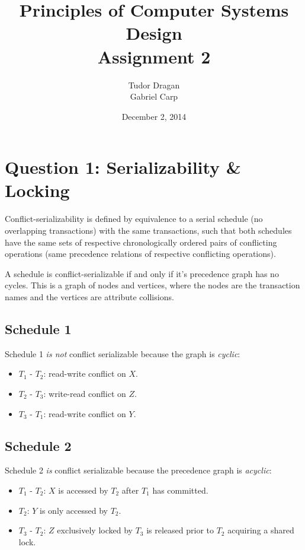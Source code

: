 \documentclass{article}      %
\title{\bf Principles of Computer Systems Design\\ {\Large Assignment 2}}  %
\author{Tudor Dragan\\
Gabriel Carp}      %
\date{December 2, 2014}      %
\begin{document}

\maketitle                   %

\section*{Question 1: Serializability \& Locking} 

Conflict-serializability is defined by equivalence to a serial schedule (no overlapping transactions) with the same transactions, such that both schedules have the same sets of respective chronologically ordered pairs of conflicting operations (same precedence relations of respective conflicting operations).

A schedule is conflict-serializable if and only if it's precedence graph has no cycles. This is a graph of nodes and vertices, where the nodes are the transaction names and the vertices are attribute collisions.

\subsection*{Schedule 1}

Schedule 1 \emph{is not} conflict serializable because the graph is \emph{cyclic}:
\begin{itemize}
\item $T_1$ - $T_2$: read-write conflict on $X$.
\item $T_2$ - $T_3$: write-read conflict on $Z$.
\item $T_3$ - $T_1$: read-write conflict on $Y$.
\end{itemize}

\subsection*{Schedule 2}

Schedule 2 \emph{is} conflict serializable because the precedence graph is \emph{acyclic}:
\begin{itemize}
\item $T_1$ - $T_2$: $X$ is accessed by $T_2$ after $T_1$ has committed.
\item $T_2$: $Y$ is only accessed by $T_2$.
\item $T_3$ - $T_2$: $Z$ exclusively locked by $T_3$ is released prior to $T_2$ acquiring a
shared lock.
\end{itemize}
\end{document}
